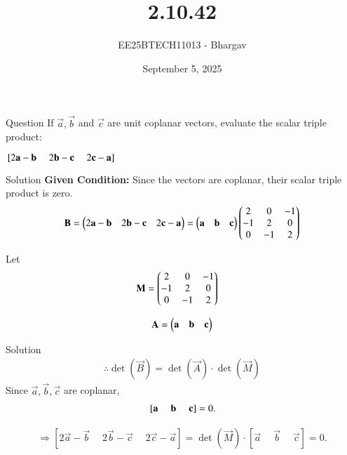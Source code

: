 \documentclass{beamer}
\title{2.10.42}
\author{EE25BTECH11013 - Bhargav}
\date{September 5, 2025}
\begin{document}
\frame{\titlepage}

\begin{frame}{Question}
If $\vec{a}, \vec{b}$ and $\vec{c}$ are unit coplanar vectors, evaluate the scalar triple product:

${}\left[2\mathbf{a} - \mathbf{b} \;\quad 2\mathbf{b} - \mathbf{c} \;\quad 2\mathbf{c} - \mathbf{a}\right]$

\vfill

\end{frame}

\begin{frame}{Solution}
\textbf{Given Condition:} Since the vectors are coplanar, their scalar triple product is zero.
\begin{align}
\mathbf{B} = \begin{pmatrix}2\mathbf{a} - \mathbf{b} & 2\mathbf{b} - \mathbf{c} & 2\mathbf{c} - \mathbf{a}\end{pmatrix} = 
\begin{pmatrix}
\mathbf{a} & \mathbf{b} & \mathbf{c}
\end{pmatrix}
\begin{pmatrix}
2 & 0 & -1 \\
-1 & 2 & 0 \\
0 & -1 & 2
\end{pmatrix}
\end{align}

Let
\begin{align}
\mathbf{M} &= \begin{pmatrix}
2 & 0 & -1 \\
-1 & 2 & 0 \\
0 & -1 & 2
\end{pmatrix}
\end{align}

\begin{align}
\mathbf{A} = \begin{pmatrix}\mathbf{a} & \mathbf{b} & \mathbf{c}\end{pmatrix} 
\end{align}



\end{frame}

\begin{frame}{Solution}
\begin{align}
\therefore \det(\vec{B}) = \det(\vec{A})\cdot \det(\vec{M})
\end{align}
Since $\vec{a}, \vec{b}, \vec{c}$ are coplanar,
\begin{align}
{}\left[\mathbf{a} \;\quad \mathbf{b} \;\quad \mathbf{c}\right] = 0.
\end{align}


\begin{align}
\Rightarrow [2\vec{a} - \vec{b}\;\quad 2\vec{b} - \vec{c}\;\quad 2\vec{c} - \vec{a}] = \det(\vec{M}) \cdot [\vec{a}\;\quad \vec{b}\;\quad \vec{c}] = 0.
\end{align}

\end{frame}
\end{document}
